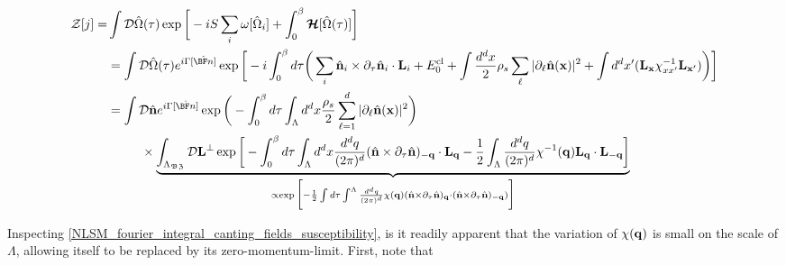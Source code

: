 \begin{equation} \begin{split}
    \mathcal{Z}[j] =& \int \mathcal{D} \hat{\Omega}(\tau) \exp\bigg[ -iS \sum_{i} \omega[\hat{\Omega}_i] + \int_{0}^{\beta} \bm{\mathcal{H}}[\hat{\Omega}(\tau)] \bigg] \\
    &=  \int \mathcal{D} \hat{\Omega}(\tau) e^{i \Gamma[\hat{{\BF n}}]}\exp 
        \bigg[ - i \int_{0}^{\beta} d\tau \bigg( \sum_{i} \hat{{\bf n}}_i \times \partial_{\tau} \hat{{\bf n}}_i \cdot {\bf L}_i +
        E_{0}^{\textnormal{cl}} + \int \frac{d^d x}{2}         
         \rho_s \sum_{\ell} |\partial_{\ell} \hat{{\bf n}}({\bf x})|^2 + \int d^d x' ({\bf L}_{\bf x }\chi_{xx'}^{-1} {\bf L}_{{\bf x}'}) \bigg) 
    \bigg] \\
    &= \int \mathcal{D} \hat{{\bf n}} e^{i \Gamma[\hat{{\BF n}}]}\exp \bigg( - \int_{0}^{\beta} d\tau \int_{\Lambda} d^d x \frac{\rho_s}{2} \sum_{\ell=1}^{d} |\partial_{\ell} \hat{{\bf n}}({\bf x})|^2 \bigg) \\
    & \blanky\blanky\blanky\blanky\blanky\blanky\blanky\blanky \times \underbrace{\int_{\Lambda_{\mathfrak{BZ}}} \mathcal{D} {\bf L}^{\perp} \exp \bigg[
    - \int_{0}^{\beta} d\tau \int_{\Lambda} d^d x \frac{d^d q}{(2\pi)^d} (\hat{{\bf n}} \times \partial_{\tau} \hat{{\bf n}})_{-{\bf q}} \cdot {\bf L}_{\bf q} - \frac{1}{2}\int_{\Lambda} \frac{d^d q}{(2\pi)^d} \chi^{-1}({\bf q}) {\bf L}_{{\bf q}} \cdot {\bf L}_{{-\bf q}} 
    \bigg]}_{{\propto \exp\bigg[-\frac{1}{2} \int d\tau \int^\Lambda \frac{d^d q}{(2\pi)^d} \chi({\bf q}) (\hat{{\bf n}} \times \partial_{\tau} \hat{{\bf n}})_{{\bf q}} \cdot (\hat{{\bf n}} \times \partial_{\tau} \hat{{\bf n}})_{-{\bf q}})
    \bigg]}}\\
\end{split}
\end{equation}

Inspecting \cref{NLSM_fourier_integral_canting_fields_susceptibility}, is it readily apparent that the variation of $\chi({\bf q})$ is small on the scale of $\Lambda$, allowing itself to be replaced by its zero-momentum-limit. First, note that 

